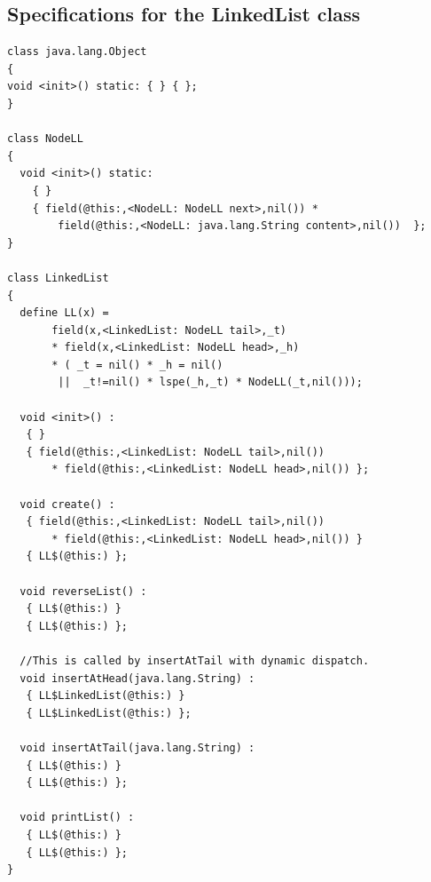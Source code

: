 \documentclass[11pt]{article}
\begin{document}
\subsection{Specifications for the LinkedList class}
\begin{verbatim}
class java.lang.Object 
{
void <init>() static: { } { };
}

class NodeLL
{
  void <init>() static: 
    { } 
    { field(@this:,<NodeLL: NodeLL next>,nil()) * 
        field(@this:,<NodeLL: java.lang.String content>,nil())  };
}

class LinkedList
{
  define LL(x) =  
       field(x,<LinkedList: NodeLL tail>,_t) 
       * field(x,<LinkedList: NodeLL head>,_h) 
       * ( _t = nil() * _h = nil() 
        ||  _t!=nil() * lspe(_h,_t) * NodeLL(_t,nil())); 
       
  void <init>() : 
   { } 
   { field(@this:,<LinkedList: NodeLL tail>,nil()) 
       * field(@this:,<LinkedList: NodeLL head>,nil()) };

  void create() : 
   { field(@this:,<LinkedList: NodeLL tail>,nil()) 
       * field(@this:,<LinkedList: NodeLL head>,nil()) }
   { LL$(@this:) };

  void reverseList() : 
   { LL$(@this:) } 
   { LL$(@this:) };

  //This is called by insertAtTail with dynamic dispatch.
  void insertAtHead(java.lang.String) : 
   { LL$LinkedList(@this:) } 
   { LL$LinkedList(@this:) };

  void insertAtTail(java.lang.String) : 
   { LL$(@this:) } 
   { LL$(@this:) };

  void printList() : 
   { LL$(@this:) } 
   { LL$(@this:) };
}
\end{verbatim}
\end{document}
